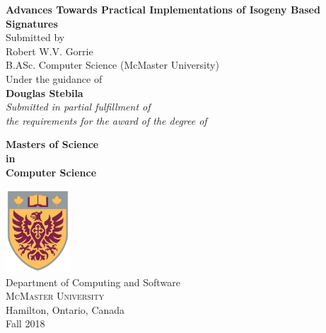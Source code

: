 \begin{titlepage}

\begin{center}
\Large \textbf {Advances Towards Practical Implementations of Isogeny Based Signatures}\\[1in]

\normalsize Submitted by \\[0.25in]

Robert W.V. Gorrie \\
B.ASc. Computer Science (McMaster University)\\

\vspace{.6in}
Under the guidance of\\
{\textbf{Douglas Stebila}}\\[0.6in]

\small \emph{Submitted in partial fulfillment of\\
        the requirements for the award of the degree of}
        \vspace{.2in}

       {\bf Masters of Science \\in\\ Computer Science}\\[0.5in]

\vfill

\includegraphics[width=0.18\textwidth]{cresticon}\\[0.1in]
\Large{Department of Computing and Software}\\
\normalsize
\textsc{McMaster University}\\
Hamilton, Ontario, Canada\\
\vspace{0.2cm}
Fall 2018

\end{center}

\end{titlepage}
